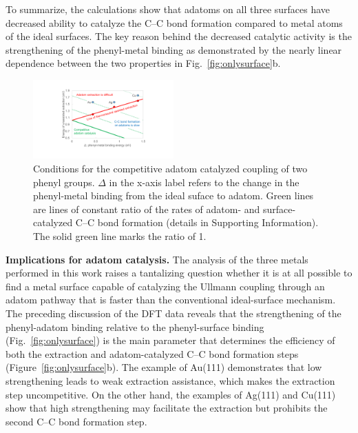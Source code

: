 \documentclass[aps,prb,amsmath,amssymb,11pt]{revtex4-1}
\newcommand{\sinfo}{Supporting Information}
\begin{document}
To summarize, the calculations show that adatoms on all three surfaces have decreased ability to catalyze the C--C bond formation compared to metal atoms of the ideal surfaces. 
The key reason behind the decreased catalytic activity is the strengthening of the phenyl-metal binding as demonstrated by the nearly linear dependence between the two properties in Fig.~\ref{fig:onlysurface}b.

\begin{figure}[bt]
\centering
\includegraphics[width=0.48\textwidth]{Fig/conclusion.pdf}
\caption{Conditions for the competitive adatom catalyzed coupling of two phenyl groups. $\Delta$ in the x-axis label refers to the change in the phenyl-metal binding from the ideal suface to adatom. Green lines are lines of constant ratio of the rates of adatom- and surface-catalyzed C--C bond formation (details in \sinfo). The solid green line marks the ratio of 1. %
} 
\label{fig:conclusion}
\end{figure}

\textbf{Implications for adatom catalysis.} 
%
The analysis of the three metals performed in this work raises a tantalizing question whether it is at all possible to find a metal surface capable of catalyzing the Ullmann coupling through an adatom pathway that is faster than the conventional ideal-surface mechanism. 
The preceding discussion of the DFT data reveals that the strengthening of the phenyl-adatom binding relative to the phenyl-surface binding (Fig.~\ref{fig:onlysurface}) is the main parameter that determines the efficiency of both the extraction and adatom-catalyzed C--C bond formation steps (Figure~\ref{fig:onlysurface}b).
The example of Au(111) demonstrates that low strengthening leads to weak extraction assistance, which makes the extraction step uncompetitive. On the other hand, the examples of Ag(111) and Cu(111) show that high strengthening may facilitate the extraction but prohibits the second C--C bond formation step. 
\end{document}
